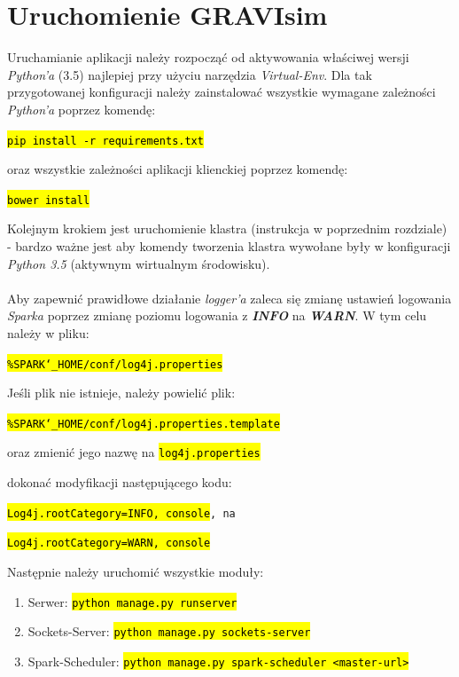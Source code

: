 \documentclass[a4paper,onecolumn,oneside,12pt]{memoir}
\begin{document}
{{\section{Uruchomienie GRAVIsim}
Uruchamianie aplikacji należy rozpocząć od aktywowania właściwej wersji \textit{Python'a} (3.5)
najlepiej przy użyciu narzędzia \textit{Virtual-Env}. Dla tak przygotowanej konfiguracji
należy zainstalować wszystkie wymagane zależności \textit{Python'a} poprzez komendę:\vspace{2mm}
\centerline{\texttt{\hl{pip install -r requirements.txt}}}\vspace{2mm}
oraz wszystkie zależności aplikacji klienckiej poprzez komendę:\\\vspace{2mm}
\centerline{\texttt{\hl{bower install}}}\vspace{2mm}

Kolejnym krokiem jest uruchomienie klastra (instrukcja w poprzednim rozdziale) - bardzo ważne jest aby komendy
tworzenia klastra wywołane były w konfiguracji \textit{Python 3.5} (aktywnym wirtualnym
środowisku).
\\
\\
Aby zapewnić prawidłowe działanie \textit{logger’a} zaleca się zmianę ustawień logowania \textit{Sparka} poprzez zmianę poziomu logowania z \textit{\textbf{INFO}} na \textit{\textbf{WARN}}. W tym celu należy w pliku:\vspace{2mm}
 \centerline{\texttt{\hl{\%SPARK{\char`_}HOME/conf/log4j.properties}}}
\begin{framed}
Jeśli plik nie istnieje, należy powielić plik:\\ \vspace{2mm}
  \centerline{\texttt{\hl{\%SPARK{\char`_}HOME/conf/log4j.properties.template}}}

oraz zmienić jego nazwę na \texttt{\hl{log4j.properties}} 
\end{framed}
dokonać modyfikacji  następującego kodu: \\ \vspace{2mm}
  \centerline{\texttt{\hl{Log4j.rootCategory=INFO, console}, na}}
  \centerline{\texttt{\hl{Log4j.rootCategory=WARN, console}}}\vspace{2mm}

Następnie należy uruchomić wszystkie moduły:
\begin{enumerate}
\item Serwer: \texttt{\hl{python manage.py runserver}}
\item Sockets-Server: \texttt{\hl{python manage.py sockets-server}}
\item Spark-Scheduler: \texttt{\hl{python manage.py spark-scheduler <master-url>}}
\end{enumerate}

}}
\end{document}

